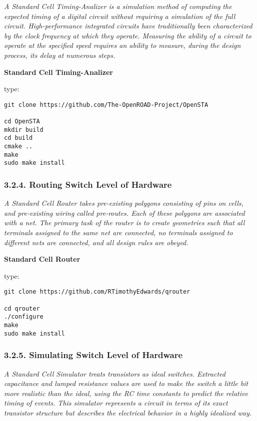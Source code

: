 \documentclass[]{article}
\begin{document}
\emph{A Standard Cell Timing-Analizer is a simulation method of
computing the expected timing of a digital circuit without requiring a
simulation of the full circuit. High-performance integrated circuits
have traditionally been characterized by the clock frequency at which
they operate. Measuring the ability of a circuit to operate at the
specified speed requires an ability to measure, during the design
process, its delay at numerous steps.}

\textbf{Standard Cell Timing-Analizer}

type:

\begin{verbatim}
git clone https://github.com/The-OpenROAD-Project/OpenSTA

cd OpenSTA
mkdir build
cd build
cmake ..
make
sudo make install
\end{verbatim}

\subsubsection{3.2.4. Routing Switch Level of
Hardware}\label{routing-switch-level-of-hardware}

\emph{A Standard Cell Router takes pre-existing polygons consisting of
pins on cells, and pre-existing wiring called pre-routes. Each of these
polygons are associated with a net. The primary task of the router is to
create geometries such that all terminals assigned to the same net are
connected, no terminals assigned to different nets are connected, and
all design rules are obeyed.}

\textbf{Standard Cell Router}

type:

\begin{verbatim}
git clone https://github.com/RTimothyEdwards/qrouter

cd qrouter
./configure
make
sudo make install
\end{verbatim}

\subsubsection{3.2.5. Simulating Switch Level of
Hardware}\label{simulating-switch-level-of-hardware}

\emph{A Standard Cell Simulator treats transistors as ideal switches.
Extracted capacitance and lumped resistance values are used to make the
switch a little bit more realistic than the ideal, using the RC time
constants to predict the relative timing of events. This simulator
represents a circuit in terms of its exact transistor structure but
describes the electrical behavior in a highly idealized way.}
\end{document}
